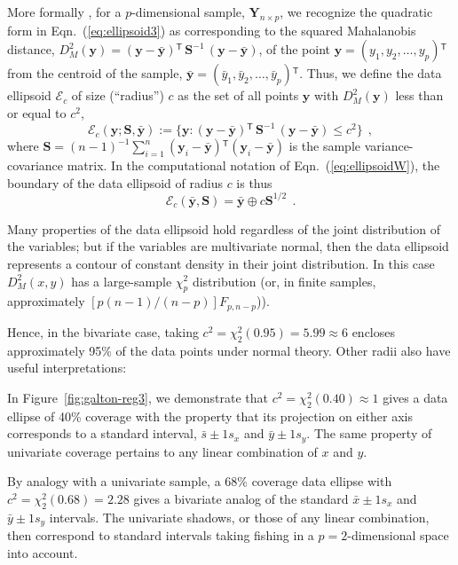 \documentclass[11pt]{article}%
\newcommand*{\figref}[1]{Figure~\ref{#1}}
\renewcommand*{\eqref}[1]{Eqn.~(\ref{#1})}
\renewcommand*{\vec}[1]{\ensuremath{\bm{#1}}}
\newcommand{\trans}{\ensuremath{^\mathsf{T}}}
\newcommand*{\mat}[1]{\ensuremath{\bm{#1}}}
\newcommand*{\dev}[1]{(#1 - \bar{#1})}
\newcommand*{\inv}[1]{\ensuremath{\mat{#1}^{-1}}}
\newcommand*{\period}{\:\: .}
\newcommand*{\comma}{\:\: ,}
\begin{document}
More formally \citep{Dempster:69,Monette:90}, for a $p$-dimensional
sample, $\mat{Y}_{n \times p}$,
we recognize the quadratic form in \eqref{eq:ellipsoid3}
as corresponding to the squared Mahalanobis distance,
$D^2_M (\vec{y}) = \dev{\vec{y}}\trans \, \inv{S} \, \dev{\vec{y}}$,
of the point
$\vec{y} = (y_1, y_2, \dots , y_p)\trans$
from the centroid of the sample,
$\bar{\vec{y}} = (\bar{y}_1, \bar{y}_2, \dots , \bar{y}_p)\trans$.
Thus, we define the data ellipsoid $\mathcal{E}_c$ of size (``radius'') $c$
as the set of all points $\vec{y}$ with $D^2_M (\vec{y})$ less than or
equal to $c^2$,
\begin{equation}\label{eq:dsq}
\mathcal{E}_c ( \vec{y}; \mat{S},  \bar{\vec{y}} )
:= \{ \vec{y} :
\dev{\vec{y}}\trans \, \inv{S} \, \dev{\vec{y}} \le c^2 \} \comma
\end{equation}
where
$\mat{S} = ({n-1})^{-1} \sum_{i=1}^n (\vec{y}_i - \bar{\vec{y}})\trans (\vec{y}_i - \bar{\vec{y}})$
is the sample variance-covariance matrix.  In the computational notation of \eqref{eq:ellipsoidW}, the boundary of the
data ellipsoid of radius $c$ is thus
\begin{equation}\label{eq:ellipsoidS}
\mathcal{E}_c(\bar{\vec{y}}, \mat{S}) = \bar{\vec{y}} \oplus c \mat{S}^{1/2} \period
\end{equation}

Many properties of the data ellipsoid hold regardless of the joint distribution of the
variables; but if the variables are multivariate normal, then the data ellipsoid represents
a contour of constant density in their joint distribution.  In this case $D^2_M (x,y)$
has a large-sample $\chi^2_p$ distribution (or, in finite samples, approximately
$[p (n-1) / (n-p)] F_{p, n-p}$)).

Hence, in the bivariate case, taking $c^2 = \chi^2_2(0.95)= 5.99 \approx 6$ encloses approximately
95\% of the data points under normal theory.  Other radii also have useful interpretations:
\begin{itemize*}
\item In \figref{fig:galton-reg3}, we demonstrate that $c^2 = \chi^2_2(0.40) \approx 1$ gives
a data ellipse of 40\% coverage with the property that its projection on either axis
corresponds to a standard interval, $\bar{s} \pm 1 s_x$ and $\bar{y} \pm 1 s_y$.  The same property of univariate
coverage pertains to
any linear combination of $x$ and $y$.
\item By analogy with a univariate sample, a 68\% coverage data ellipse with
$c^2 = \chi^2_2(0.68) = 2.28$ gives a bivariate analog of the standard $\bar{x} \pm 1 s_x$ and $\bar{y} \pm 1 s_y$ intervals.
The univariate shadows, or those of any linear combination, then correspond to standard
intervals taking fishing in a $p=2$-dimensional space into account.
\end{itemize*}
\end{document}
